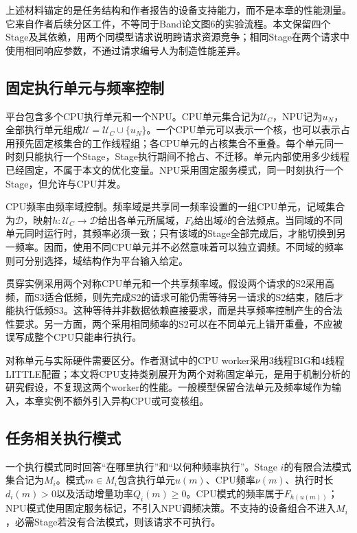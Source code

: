 上述材料锚定的是任务结构和作者报告的设备支持能力，而不是本章的性能测量。它来自作者后续分区工件，不等同于Band论文图6的实验流程。本文保留四个Stage及其依赖，用两个同模型请求说明跨请求资源竞争；相同Stage在两个请求中使用相同响应参数，不通过请求编号人为制造性能差异。

\subsection{固定执行单元与频率控制}

平台包含多个CPU执行单元和一个NPU。CPU单元集合记为\(\mathcal U_C\)，NPU记为\(u_N\)，全部执行单元组成\(\mathcal U=\mathcal U_C\cup\{u_N\}\)。一个CPU单元可以表示一个核，也可以表示占用预先固定核集合的工作线程组；各CPU单元的占核集合不重叠。每个单元同一时刻只能执行一个Stage，Stage执行期间不抢占、不迁移。单元内部使用多少线程已经固定，不属于本文的优化变量。NPU采用固定服务模式，同一时刻执行一个Stage，但允许与CPU并发。

CPU频率由频率域控制。频率域是共享同一频率设置的一组CPU单元，记域集合为\(\mathcal D\)，映射\(h:\mathcal U_C\to\mathcal D\)给出各单元所属域，\(F_\delta\)给出域\(\delta\)的合法频点。当同域的不同单元同时运行时，其频率必须一致；只有该域的Stage全部完成后，才能切换到另一频率。因而，使用不同CPU单元并不必然意味着可以独立调频。不同域的频率则可分别选择，域结构作为平台输入给定。

贯穿实例采用两个对称CPU单元和一个共享频率域。假设两个请求的S2采用高频，而S3适合低频，则先完成S2的请求可能仍需等待另一请求的S2结束，随后才能执行低频S3。这种等待并非数据依赖直接要求，而是共享频率控制产生的合法性要求。另一方面，两个采用相同频率的S2可以在不同单元上错开重叠，不应被误写成整个CPU只能串行执行。

对称单元与实际硬件需要区分。作者测试中的CPU worker采用3线程BIG和4线程LITTLE配置\cite{source5}；本文将CPU支持类别展开为两个对称固定单元，是用于机制分析的研究假设，不复现这两个worker的性能。一般模型保留合法单元及频率域作为输入，本章实例不额外引入异构CPU或可变核组。

\subsection{任务相关执行模式}

一个执行模式同时回答“在哪里执行”和“以何种频率执行”。Stage \(i\)的有限合法模式集合记为\(M_i\)。模式\(m\in M_i\)包含执行单元\(u(m)\)、CPU频率\(\nu(m)\)、执行时长\(d_i(m)>0\)以及活动增量功率\(Q_i(m)\ge0\)。CPU模式的频率属于\(F_{h(u(m))}\)；NPU模式使用固定服务标记，不引入NPU调频决策。不支持的设备组合不进入\(M_i\)，必需Stage若没有合法模式，则该请求不可执行。

